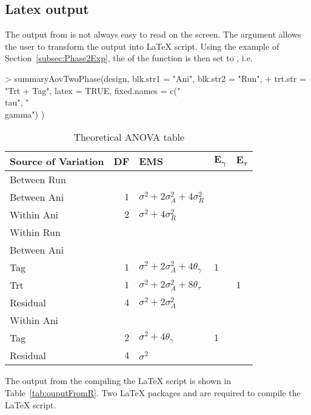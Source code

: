 \documentclass[article]{jss}
\begin{document}
\subsection{Latex output}
The output from  is not always easy to read on the screen. The argument  allows the user to transform the  output into {\LaTeX} script. Using the example of Section~\ref{subsec:Phase2Exp}, the  of the  function is then set to , i.e.\
\begin{CodeChunk}
\begin{CodeInput} 
> summaryAovTwoPhase(design, blk.str1 = "Ani", blk.str2 = "Run", 
+ trt.str = "Trt + Tag", latex = TRUE, fixed.names = c("\\tau", "\\gamma") ) 
\end{CodeInput}
\begin{CodeOutput}
\begin{table}[ht]
\centering
\caption{Theoretical ANOVA table}
\begin{tabular}[t]{lrlll} 
\toprule 
\multicolumn{1}{l}{\textbf{Source of Variation}} & 
\multicolumn{1}{l}{\textbf{DF}} & \multicolumn{1}{l}{\textbf{EMS}}&
\multicolumn{1}{l}{$\bm{E_{\gamma}}$}&\multicolumn{1}{l}{$\bm{E_{\tau}}$}\\ 
\midrule 
Between Run &  &  & & \\ 
\quad Between Ani & $1$ & $\sigma^2+2\sigma_{A}^2+4\sigma_{R}^2$ & & \\ \hline 
\quad Within Ani & $2$ & $\sigma^2+4\sigma_{R}^2$ & & \\ \hline 
Within Run &  &  & & \\ 
\quad Between Ani &  &  & & \\ 
\quad \quad Tag & $1$ & $\sigma^2+2\sigma_{A}^2+4\theta_{\gamma}$ &$1$ & \\ 
\quad \quad Trt & $1$ & $\sigma^2+2\sigma_{A}^2+8\theta_{\tau}$ & & $1$\\ 
\quad \quad Residual & $4$ & $\sigma^2+2\sigma_{A}^2$ & & \\ \hline 
\quad Within Ani &  &  & & \\ 
\quad \quad Tag & $2$ & $\sigma^2+4\theta_{\gamma}$ &$1$ & \\ 
\quad \quad Residual & $4$ & $\sigma^2$ & & \\ 
\bottomrule 
\end{tabular} 
\label{tab:} 
\end{table} 
\end{CodeOutput}
\end{CodeChunk} 
The output from the compiling the {\LaTeX} script is shown in Table~\ref{tab:ouputFromR}. Two {\LaTeX} packages  and  are required to compile the {\LaTeX} script. 
\end{document}
